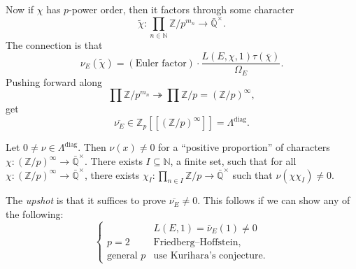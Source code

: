 \documentclass[reqno]{amsart} 
\begin{document}
Now if $\chi$ has $p$-power order, then it factors through some character
\begin{equation*}
  \tilde{\chi} : \prod_{n \in \mathbb{N} } \mathbb{Z} / p^{m_n} \rightarrow \bar{\mathbb{Q}}^\times.
\end{equation*}
The connection is that
\begin{equation*}
  \nu_E(\tilde{\chi}) = (\text{Euler factor}) \cdot  \frac{L(E, \chi, 1) \tau(\bar{\chi})}{\Omega_E}.
\end{equation*}
Pushing forward along
\begin{equation*}
  \prod \mathbb{Z} / p^{m_n} \twoheadrightarrow \prod \mathbb{Z} / p =(\mathbb{Z} / p)^\infty,
\end{equation*}
get
\begin{equation*}
  \overline{\nu_E} \in \mathbb{Z}_p[[(\mathbb{Z} / p)^\infty]]
  = \Lambda^{\mathrm{diag}}.
\end{equation*}


\begin{theorem}[K--N]
  Let $0 \neq\nu \in \Lambda^{\mathrm{diag}}$.  Then $\nu(x) \neq 0$ for a ``positive proportion'' of characters $\chi :(\mathbb{Z} / p)^\infty \rightarrow \bar{\mathbb{Q}}^\times$.  There exists $I \subseteq \mathbb{N}$, a finite set, such that for all $\chi :(\mathbb{Z} / p)^\infty \rightarrow \bar{\mathbb{Q}}^\times$, there exists $\chi_I : \prod_{n \in I} \mathbb{Z} / p \rightarrow \bar{\mathbb{Q}}^\times$ such that $\nu(\chi \chi_I) \neq 0.$
\end{theorem}

The \emph{upshot} is that it suffices to prove $\overline{\nu_E} \neq 0$.  This follows if we can show any of the following:
\begin{equation*}
  \begin{cases}
    &   L(E, 1) = \bar{\nu }_E(1) \neq 0 \\
    p = 2    & \text{Friedberg--Hoffstein}, \\
    \text{general } p                                          & \text{use Kurihara's conjecture.}
  \end{cases}
\end{equation*}
{} 
\end{document}
